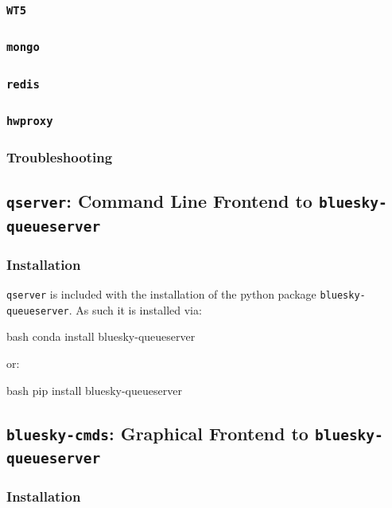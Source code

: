 \subsubsection{\texttt{WT5}}
\subsubsection{\texttt{mongo}}
\subsubsection{\texttt{redis}}
\subsubsection{\texttt{hwproxy}}
\subsubsection{Troubleshooting}

\subsection{\texttt{qserver}: Command Line Frontend to \texttt{bluesky-queueserver}}

\subsubsection{Installation}

\texttt{qserver} is included with the installation of the python package \texttt{bluesky-queueserver}.
As such it is installed via:

\begin{codefragment}{bash}
conda install bluesky-queueserver
\end{codefragment}

or:

\begin{codefragment}{bash}
pip install bluesky-queueserver
\end{codefragment}

\subsection{\texttt{bluesky-cmds}: Graphical Frontend to \texttt{bluesky-queueserver}}

\subsubsection{Installation}

